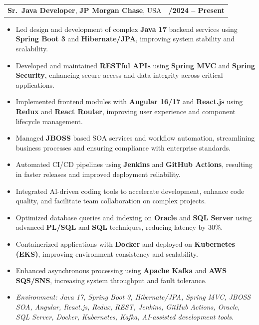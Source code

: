 \documentclass[letterpaper,11pt]{article}
\makeatletter
\newcommand{\resumeItem}[1]{
  \item\footnotesize{
    {#1 \vspace{-2pt}}
  }
}
\newcommand{\resumeSubheading}[4]{
  \vspace{-2pt}\item
    \begin{tabular*}{1.0\textwidth}[t]{l@{\extracolsep{\fill}}r}
      \textbf{\fontsize{10pt}{14pt}\selectfont #3}, \textbf{\fontsize{10pt}{14pt}\selectfont #1}, \fontsize{10pt}{14pt}\selectfont #4 & \textbf{\fontsize{10pt}{14pt}\selectfont #2} \\
    \end{tabular*}\vspace{-7pt}
}
\newcommand{\resumeItemListStart}{\begin{itemize}[leftmargin=*]}
\newcommand{\resumeItemListEnd}{\end{itemize}\vspace{-5pt}}
\makeatother
\begin{document}
\resumeSubheading
{JP Morgan Chase}{09/2024 -- Present}
{Sr.\ Java Developer}{USA}
\resumeItemListStart
  \resumeItem{Led design and development of complex \textbf{Java 17} backend services using \textbf{Spring Boot 3} and \textbf{Hibernate/JPA}, improving system stability and scalability.}
  \resumeItem{Developed and maintained \textbf{RESTful APIs} using \textbf{Spring MVC} and \textbf{Spring Security}, enhancing secure access and data integrity across critical applications.}
  \resumeItem{Implemented frontend modules with \textbf{Angular 16/17} and \textbf{React.js} using \textbf{Redux} and \textbf{React Router}, improving user experience and component lifecycle management.}
  \resumeItem{Managed \textbf{JBOSS} based SOA services and workflow automation, streamlining business processes and ensuring compliance with enterprise standards.}
  \resumeItem{Automated CI/CD pipelines using \textbf{Jenkins} and \textbf{GitHub Actions}, resulting in faster releases and improved deployment reliability.}
  \resumeItem{Integrated AI-driven coding tools to accelerate development, enhance code quality, and facilitate team collaboration on complex projects.}
  \resumeItem{Optimized database queries and indexing on \textbf{Oracle} and \textbf{SQL Server} using advanced \textbf{PL/SQL} and \textbf{SQL} techniques, reducing latency by 30\%.}
  \resumeItem{Containerized applications with \textbf{Docker} and deployed on \textbf{Kubernetes (EKS)}, improving environment consistency and scalability.}
  \resumeItem{Enhanced asynchronous processing using \textbf{Apache Kafka} and \textbf{AWS SQS/SNS}, increasing system throughput and fault tolerance.}
  \resumeItem{\textit{Environment: Java 17, Spring Boot 3, Hibernate/JPA, Spring MVC, JBOSS SOA, Angular, React.js, Redux, REST, Jenkins, GitHub Actions, Oracle, SQL Server, Docker, Kubernetes, Kafka, AI-assisted development tools.}}
\resumeItemListEnd
\end{document}
